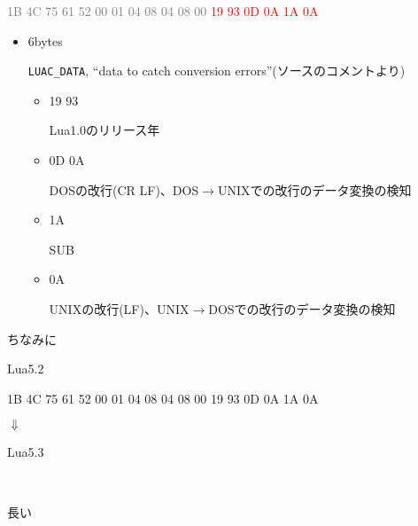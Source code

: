 \begin{frame}{\insertsubsubsectionhead}
	\textcolor{gray}{1B 4C 75 61 52 00 01 04 08 04 08 00} \textcolor{red}{19 93 0D 0A 1A 0A}
	\begin{itemize}
		\item 6bytes

		\lstinline{LUAC_DATA}, ``data to catch conversion errors''(ソースのコメントより)

		\begin{itemize}
			\item 19 93

				Lua1.0のリリース年
			\item 0D 0A

				DOSの改行(CR LF)、DOS$\rightarrow$UNIXでの改行のデータ変換の検知
			\item 1A

				SUB
			\item 0A

				UNIXの改行(LF)、UNIX$\rightarrow$DOSでの改行のデータ変換の検知
		\end{itemize}
\end{itemize}
\end{frame}
\begin{frame}{\insertsubsubsectionhead}
	ちなみに

	Lua5.2

	\begin{center}
		1B 4C 75 61 52 00 01 04 08 04 08 00 19 93 0D 0A 1A 0A

		$\Downarrow$
	\end{center}

	Lua5.3

	\begin{center}
		 
		 
		 
		\ 
	\pause

	\alert{\Huge{}長い}
	\end{center}
\end{frame}
